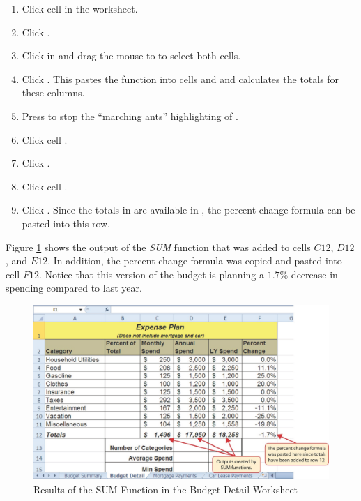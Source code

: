 \begin{enumbox}
	\begin{enumerate}
		\item Click cell  in the  worksheet.
		\item Click .
		\item Click in  and drag the mouse to  to select both cells.
		\item Click . This pastes the  function into cells  and  and calculates the totals for these columns.
		\item Press  to stop the ``marching ants'' highlighting of .
		\item Click cell .
		\item Click .
		\item Click cell .
		\item Click . Since the totals in are available in , the percent change formula can be pasted into this row.
	\end{enumerate}
\end{enumbox}

Figure \ref{02:fig12} shows the output of the \textit{SUM} function that was added to cells $ C12 $, $ D12 $, and $ E12 $. In addition, the percent change formula was copied and pasted into cell $ F12 $. Notice that this version of the budget is planning a $ 1.7 $\% decrease in spending compared to last year.

\begin{figure}[H]
	\centering
	\includegraphics[width=\maxwidth{.95\linewidth}]{gfx/ch02_fig12}
	\caption{Results of the SUM Function in the Budget Detail Worksheet}
	\label{02:fig12}
\end{figure}

